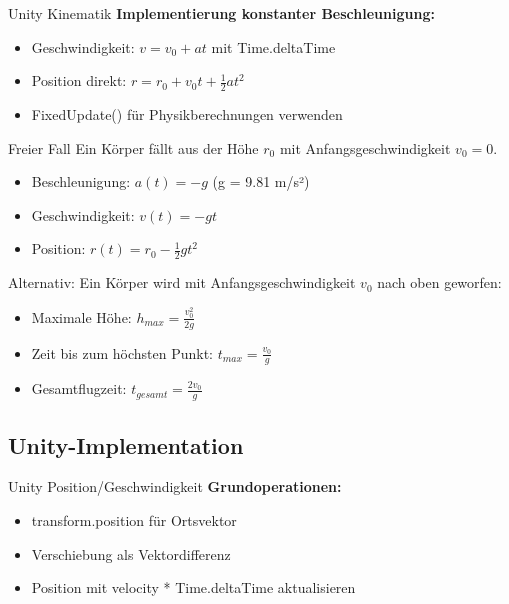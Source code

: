 \begin{concept}{Unity Kinematik}
    \textbf{Implementierung konstanter Beschleunigung:}
    \begin{itemize}
        \item Geschwindigkeit: $v = v_0 + at$ mit Time.deltaTime
        \item Position direkt: $r = r_0 + v_0t + \frac{1}{2}at^2$
        \item FixedUpdate() für Physikberechnungen verwenden
    \end{itemize}
\end{concept}

\begin{example2}{Freier Fall}
    Ein Körper fällt aus der Höhe $r_0$ mit Anfangsgeschwindigkeit $v_0 = 0$.
    
    \begin{itemize}
        \item Beschleunigung: $a(t) = -g$ (g = 9.81 m/s²)
        \item Geschwindigkeit: $v(t) = -gt$
        \item Position: $r(t) = r_0 - \frac{1}{2}gt^2$
    \end{itemize}
    
    Alternativ: Ein Körper wird mit Anfangsgeschwindigkeit $v_0$ nach oben geworfen:
    \begin{itemize}
        \item Maximale Höhe: $h_{max} = \frac{v_0^2}{2g}$ 
        \item Zeit bis zum höchsten Punkt: $t_{max} = \frac{v_0}{g}$
        \item Gesamtflugzeit: $t_{gesamt} = \frac{2v_0}{g}$
    \end{itemize}
\end{example2}

\subsection{Unity-Implementation}

\begin{concept}{Unity Position/Geschwindigkeit}
    \textbf{Grundoperationen:}
    \begin{itemize}
        \item transform.position für Ortsvektor
        \item Verschiebung als Vektordifferenz
        \item Position mit velocity * Time.deltaTime aktualisieren
    \end{itemize}
\end{concept}

